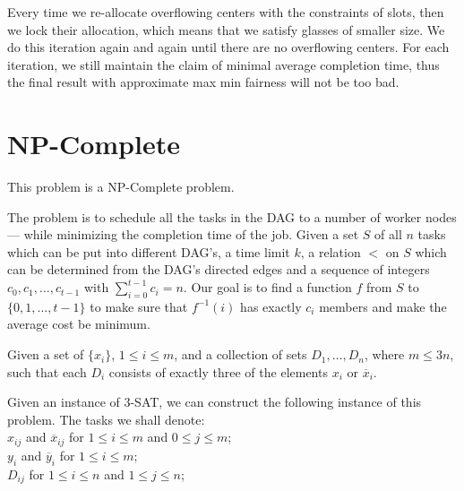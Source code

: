 \documentclass{llncs}
\begin{document}
Every time we re-allocate overflowing centers with the constraints of slots, then we lock their allocation, which means that we satisfy glasses of smaller size. We do this iteration again and again until there are no overflowing centers. For each iteration, we still maintain the claim of minimal average completion time, thus the final result with approximate max min fairness will not be too bad. 




\section{NP-Complete}

This problem is a NP-Complete problem.\cite{10.1145/344588.344618}

The problem is to schedule all the tasks in the DAG to a number of worker nodes --- while minimizing the completion time of the job. Given a set $S$ of all $n$ tasks which can be put into different DAG's, a time limit $k$, a relation $<$ on $S$ which can be determined from the DAG's directed edges and a sequence of integers $c_0,c_1,\ldots,c_{t-1}$ with $\sum_{i=0}^{t-1}{c_i} = n$. Our goal is to find a function $f$ from $S$ to $\{0,1,\ldots,t-1\}$ to make sure that $f^{-1}{(i)}$ has exactly $c_i$ members and make the average cost be minimum.

\begin{definition}
Given a set of $\{x_i\}$, $1 \leq i \leq m$, and a collection of sets $D_1,\ldots,D_n$, where $m \leq 3n$, such that each $D_i$ consists of exactly three of the elements $x_i$ or $\overline x_i$.
\end{definition}

Given an instance of \textsc{3-SAT}, we can construct the following instance of this problem. The tasks we shall denote:\\
$x_{ij}$ and $\overline x_{ij}$ for $1 \leq i \leq m$ and $0 \leq j \leq m$;\\
$y_i$ and $\overline y_i$ for $1 \leq i \leq m$;\\
$D_{ij}$ for $1 \leq i \leq n$ and $1 \leq j \leq n$;
\end{document}
